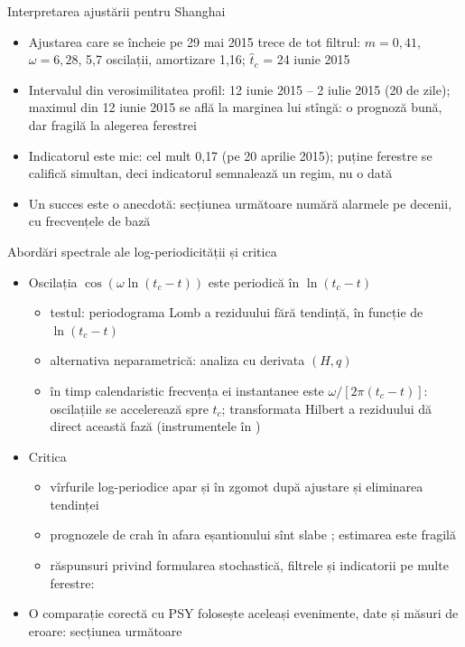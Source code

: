 \begin{frame}{Interpretarea ajustării pentru Shanghai}
\itemsize{\small}
\begin{itemize}
    \item Ajustarea care se încheie pe 29 mai 2015 trece de tot filtrul: $m = 0{,}41$, $\omega = 6{,}28$, 5{,}7 oscilații, amortizare 1{,}16; $\hat t_c$ = 24 iunie 2015
    \item Intervalul din verosimilitatea profil: 12 iunie 2015 -- 2 iulie 2015 (20 de zile); maximul din 12 iunie 2015 se află la marginea lui stîngă: o prognoză bună, dar fragilă la alegerea ferestrei
    \item Indicatorul este mic: cel mult 0{,}17 (pe 20 aprilie 2015); puține ferestre se califică simultan, deci indicatorul semnalează un regim, nu o dată
    \item Un succes este o anecdotă: secțiunea următoare numără alarmele pe decenii, cu frecvențele de bază
\end{itemize}
\end{frame}

\begin{frame}{Abordări spectrale ale log-periodicității și critica}
\itemsize{\small}
\begin{itemize}
    \item Oscilația $\cos(\omega\ln(t_c - t))$ este periodică în $\ln(t_c - t)$
    \begin{itemize}
        \item testul: periodograma Lomb a reziduului fără tendință, în funcție de $\ln(t_c - t)$ 
        \item alternativa neparametrică: analiza cu derivata $(H, q)$ 
        \item în timp calendaristic frecvența ei instantanee este $\omega/[2\pi(t_c - t)]$: oscilațiile se accelerează spre $t_c$; transformata Hilbert a reziduului dă direct această fază (instrumentele în )
    \end{itemize}
    \item Critica
    \begin{itemize}
        \item vîrfurile log-periodice apar și în zgomot după ajustare și eliminarea tendinței 
        \item prognozele de crah în afara eșantionului sînt slabe ; estimarea este fragilă 
        \item răspunsuri privind formularea stochastică, filtrele și indicatorii pe multe ferestre: 
    \end{itemize}
    \item O comparație corectă cu PSY folosește aceleași evenimente, date și măsuri de eroare: secțiunea următoare
\end{itemize}
\end{frame}

